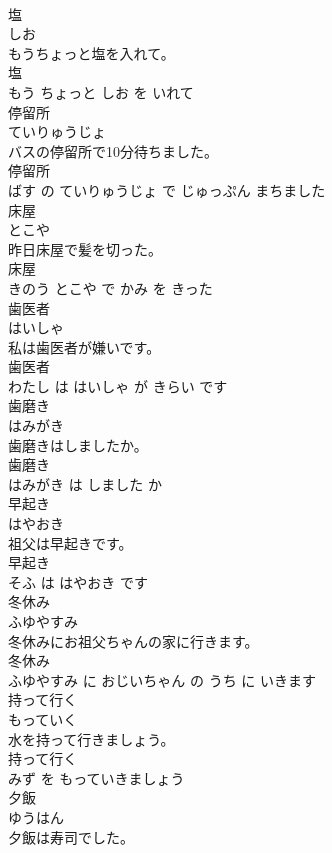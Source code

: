 \documentclass[8pt]{extreport}
\begin{document}
\begin{CJK}{UTF8}{min}
\\	塩	
\\	しお			
\\	もうちょっと塩を入れて。	
\\	塩 
\\	もう ちょっと しお を いれて			
\\	停留所	
\\	ていりゅうじょ			
\\	バスの停留所で10分待ちました。	
\\	停留所 
\\	ばす の ていりゅうじょ で じゅっぷん まちました			
\\	床屋	
\\	とこや			
\\	昨日床屋で髪を切った。	
\\	床屋 
\\	きのう とこや で かみ を きった			
\\	歯医者	
\\	はいしゃ			
\\	私は歯医者が嫌いです。	
\\	歯医者 
\\	わたし は はいしゃ が きらい です			
\\	歯磨き	
\\	はみがき			
\\	歯磨きはしましたか。	
\\	歯磨き 
\\	はみがき は しました か			
\\	早起き	
\\	はやおき			
\\	祖父は早起きです。	
\\	早起き 
\\	そふ は はやおき です			
\\	冬休み	
\\	ふゆやすみ			
\\	冬休みにお祖父ちゃんの家に行きます。	
\\	冬休み 
\\	ふゆやすみ に おじいちゃん の うち に いきます			
\\	持って行く	
\\	もっていく			
\\	水を持って行きましょう。	
\\	持って行く 
\\	みず を もっていきましょう			
\\	夕飯	
\\	ゆうはん			
\\	夕飯は寿司でした。	

\end{CJK}
\end{document}
